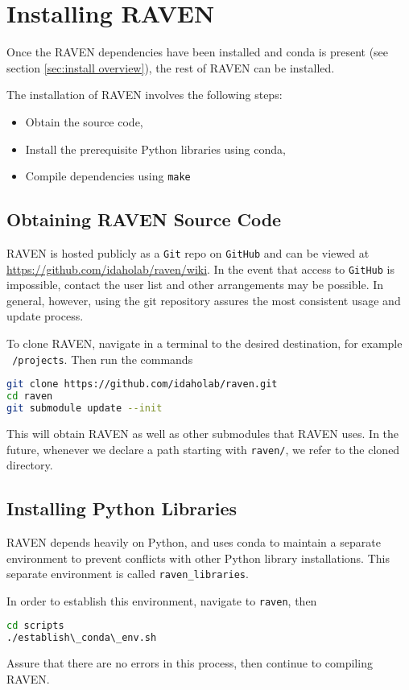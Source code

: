 \section{Installing RAVEN}
\label{sec:clone raven}

Once the RAVEN dependencies have been installed  and conda is present
(see section \ref{sec:install overview}), the rest of RAVEN can be installed.

The installation of RAVEN involves the following steps:
\begin{itemize}
  \item Obtain the source code,
  \item Install the prerequisite Python libraries using conda,
  \item Compile dependencies using \texttt{make}
\end{itemize}


\subsection{Obtaining RAVEN Source Code}
RAVEN is hosted publicly as a \texttt{Git} repo on \texttt{GitHub}
and can be viewed at \url{https://github.com/idaholab/raven/wiki}.
In the event that access to \texttt{GitHub} is impossible, contact the user list and other arrangements may be
possible.  In general, however, using the git repository assures the most consistent usage and update process.

To clone RAVEN, navigate in a terminal to the desired destination, for example \texttt{~/projects}.  Then run
the commands
\begin{lstlisting}[language=bash]
git clone https://github.com/idaholab/raven.git
cd raven
git submodule update --init
\end{lstlisting}
This will obtain RAVEN as well as other submodules that RAVEN uses.  In the future, whenever we declare a path
starting with \texttt{raven/}, we refer to the cloned directory.


\subsection{Installing Python Libraries}
RAVEN depends heavily on Python, and uses conda to maintain a separate environment to prevent conflicts with
other Python library installations.  This separate environment is called \texttt{raven\_libraries}.

In order to establish this environment, navigate to \texttt{raven}, then
\begin{lstlisting}[language=bash]
cd scripts
./establish\_conda\_env.sh
\end{lstlisting}
Assure that there are no errors in this process, then continue to compiling RAVEN.


